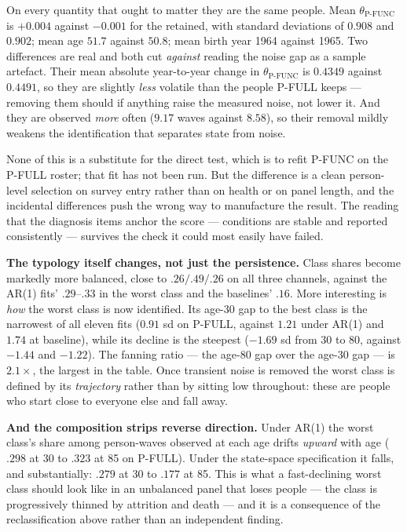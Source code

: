 \documentclass[11pt]{article}
\begin{document}
On every quantity that ought to matter they are the same people. Mean
$\theta_{\text{P-FUNC}}$ is $+0.004$ against $-0.001$ for the retained, with
standard deviations of $0.908$ and $0.902$; mean age $51.7$ against $50.8$;
mean birth year 1964 against 1965. Two differences are real and both cut
\emph{against} reading the noise gap as a sample artefact. Their mean absolute
year-to-year change in $\theta_{\text{P-FUNC}}$ is $0.4349$ against $0.4491$,
so they are slightly \emph{less} volatile than the people P-FULL keeps ---
removing them should if anything raise the measured noise, not lower it. And
they are observed \emph{more} often ($9.17$ waves against $8.58$), so their
removal mildly weakens the identification that separates state from noise.

None of this is a substitute for the direct test, which is to refit P-FUNC on
the P-FULL roster; that fit has not been run. But the difference is a clean
person-level selection on survey entry rather than on health or on panel
length, and the incidental differences push the wrong way to manufacture the
result. The reading that the diagnosis items anchor the score --- conditions
are stable and reported consistently --- survives the check it could most
easily have failed.

\textbf{The typology itself changes, not just the persistence.} Class shares
become markedly more balanced, close to $.26 / .49 / .26$ on all three
channels, against the AR(1) fits' $.29$--$.33$ in the worst class and the
baselines' $.16$. More interesting is \emph{how} the worst class is now
identified. Its age-30 gap to the best class is the narrowest of all eleven
fits ($0.91$ sd on P-FULL, against $1.21$ under AR(1) and $1.74$ at
baseline), while its decline is the steepest ($-1.69$ sd from 30 to 80,
against $-1.44$ and $-1.22$). The fanning ratio --- the age-80 gap over the
age-30 gap --- is $2.1\times$, the largest in the table. Once transient noise
is removed the worst class is defined by its \emph{trajectory} rather than by
sitting low throughout: these are people who start close to everyone else and
fall away.

\textbf{And the composition strips reverse direction.} Under AR(1) the
worst class's share among person-waves observed at each age drifts
\emph{upward} with age ($.298$ at 30 to $.323$ at 85 on P-FULL). Under the
state-space specification it falls, and substantially: $.279$ at 30 to
$.177$ at 85. This is what a fast-declining worst class should look like in
an unbalanced panel that loses people --- the class is progressively thinned
by attrition and death --- and it is a consequence of the reclassification
above rather than an independent finding.
\end{document}
